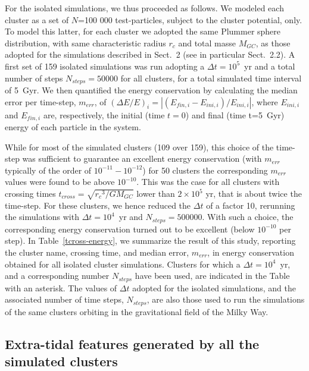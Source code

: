         For the isolated simulations, we thus proceeded as follows. We modeled each cluster as a set of $N$=100 000 test-particles, subject to the cluster potential, only. To model this latter, for each cluster we adopted the same Plummer sphere distribution, with same characteristic radius $r_c$ and total masse $M_{GC}$, as those adopted for the simulations described in Sect.~2 (see in particular Sect.~2.2).  A  first set of 159 isolated simulations was run adopting a   $\Delta t=10^5$~yr and a total number of steps $N_{steps}=50 000$ for all clusters, for a total simulated time interval of 5~Gyr.  We then quantified the energy conservation by calculating the median error per time-step, $m_{err}$, of $(\Delta E/E)_i=|(E_{fin,i}-E_{ini,i})/E_{ini,i}|$, where $E_{ini,i}$ and $E_{fin,i}$ are, respectively, the initial (time $t=0$) and final (time t=5~Gyr) energy of each particle in the system.

        While for most of the simulated clusters (109 over 159), this choice of the time-step was sufficient to guarantee an excellent energy conservation (with $m_{err}$ typically of the order of $10^{-11}-10^{-12}$) for 50 clusters the corresponding $m_{err}$ values were found to be above $10^{-10}$. This was the case for all clusters with crossing times $t_{cross}=\sqrt{{r_c}^3/GM_{GC}}$ lower than $2\times 10^5$ yr, that is about twice the time-step. For these clusters, we hence reduced the $\Delta t$ of a factor 10,  rerunning the simulations with $\Delta t=10^4$~yr and  $N_{steps}=500 000$. With such a choice, the corresponding energy conservation turned out to be excellent (below $10^{-10}$ per step). In Table~\ref{tcross-energy}, we summarize the  result of this study, reporting the cluster name, crossing time, and median error, $m_{err}$, in energy conservation obtained for all isolated cluster simulations. Clusters for which a $\Delta t=10^4$~yr, and a corresponding number $N_{steps}$ have been used, are indicated in the Table with an asterisk. The values of  $\Delta t$ adopted for the isolated simulations, and the associated number of time steps, $N_{steps}$, are also those used to run the simulations of the same clusters orbiting in the gravitational field of the Milky Way. 

    \subsection{Extra-tidal features generated by all the simulated clusters}\label{allstreams}

